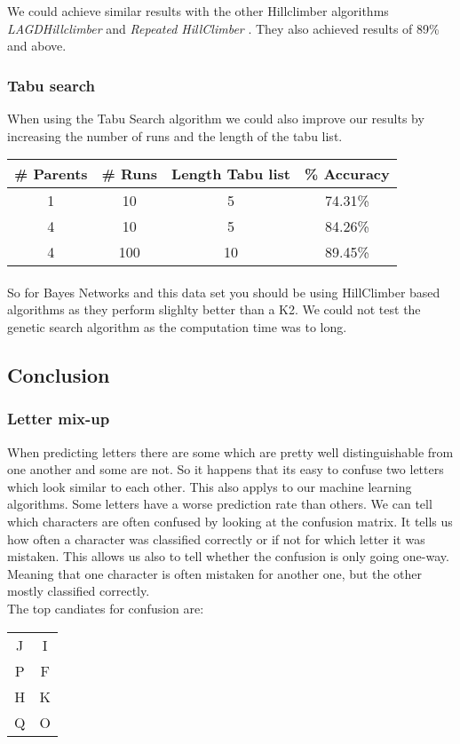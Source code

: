 \documentclass{sig-alternate-05-2015}
\begin{document}
{We could achieve similar results with the other Hillclimber algorithms \emph{LAGDHillclimber} and \emph{Repeated HillClimber} . They also achieved results of 89\% and above.

\subsubsection{Tabu search}
When using the Tabu Search algorithm we could also improve our results by increasing the number of runs and the length of the tabu list.
\begin{center}
\begin{tabular}{ c | c  | c | c }
\textbf{\# Parents} & \textbf{\# Runs} & \textbf{Length Tabu list}  & \textbf{\% Accuracy} \\
\hline
1  & 10 & 5 & 74.31\% \\
4  & 10 & 5 & 84.26\% \\
4  & 100 & 10&  89.45\% \\
\end{tabular}
\end{center}

\paragraph{}So for Bayes Networks and this data set you should be using HillClimber based algorithms as they perform slighlty better than a K2. We could not test the genetic search algorithm as the computation time was to long.

\subsection{Conclusion}
\subsubsection{Letter mix-up}
When predicting letters there are some which are pretty well distinguishable from one another and some are not. So it happens that its easy to confuse two letters which look similar to each other. This also applys to our machine learning algorithms. Some letters have a worse prediction rate than others. We can tell which characters are often confused by looking at the confusion matrix. It tells us how often a character was classified correctly or if not for which letter it was mistaken. This allows us also to tell whether the confusion is only going one-way. Meaning that one character is often mistaken for another one, but the other mostly classified correctly.\\
The top candiates for confusion are:\\
\begin{center}
\begin{tabular}{  c |  c  }
J & I \\
P & F \\
H & K \\
Q & O \\
\end{tabular}
\end{center}
}
\end{document}
